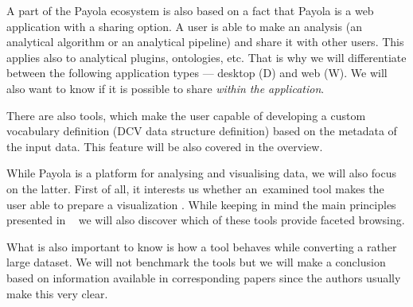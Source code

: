 A part of the Payola ecosystem is also based on a fact that Payola is a web 
application with a sharing option. A user is able to make an analysis (an
analytical algorithm or an analytical pipeline) and share it with other users. This applies also to 
analytical plugins, ontologies, etc. That is why we will differentiate between the following
application types --- desktop (D) and web (W). We will also want to 
know if it is possible to share \emph{within the application}.

There are also tools, which make the user capable of developing a custom vocabulary 
definition (DCV data structure definition) based on the metadata of the input data.
This feature will be also covered in the overview.

While Payola is a platform for analysing and visualising data, we will also 
focus on the latter. First of all, it interests us whether 
an~examined tool makes the user able to prepare a visualization . While keeping 
in mind the main principles presented in ~\cite{mantra} we will also discover 
which of these tools provide faceted browsing.

What is also important to know is how a tool behaves while converting a rather 
large dataset. We will not benchmark the tools but we will make a conclusion based 
on information available in corresponding papers since the authors usually make 
this very clear.


